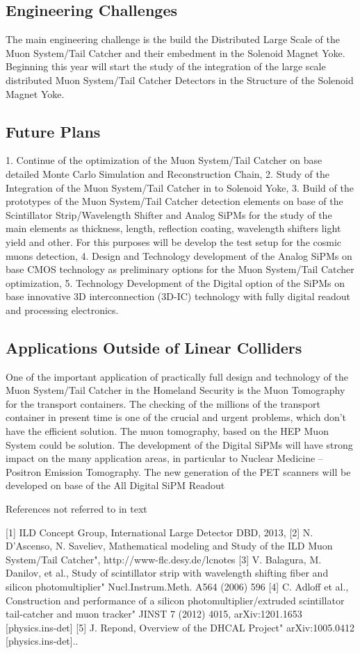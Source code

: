 \subsection{Engineering Challenges}
The main engineering challenge is the build the Distributed Large Scale of the Muon System/Tail Catcher and their embedment in the Solenoid Magnet Yoke. Beginning this year will start the study of the integration of the large scale distributed Muon System/Tail Catcher Detectors in the Structure of the Solenoid Magnet Yoke.

\subsection{Future Plans}
1.	Continue of the optimization of the Muon System/Tail Catcher on base detailed Monte Carlo Simulation and Reconstruction Chain,
2.	Study of the Integration of the Muon System/Tail Catcher in to Solenoid Yoke,
3.	Build of the prototypes of the Muon System/Tail Catcher detection elements on base of the Scintillator Strip/Wavelength Shifter and Analog SiPMs for the study of the main elements as thickness, length, reflection coating, wavelength shifters light yield and other. For this purposes will be develop the test setup for the cosmic muons detection,
4.	Design and Technology development of the Analog SiPMs on base CMOS technology as preliminary options for the Muon System/Tail Catcher optimization,
5.	Technology Development of the Digital option of the SiPMs on base innovative 3D interconnection (3D-IC) technology with fully digital readout and processing electronics.

\subsection{Applications Outside of Linear Colliders}
One of the important application of practically full design and technology of the Muon System/Tail Catcher in the Homeland Security is the Muon Tomography for the transport containers. The checking of the millions of the transport container in present time is one of the crucial and urgent problems, which don’t have the efficient solution. The muon tomography, based on the HEP Muon System could be solution. The development of the Digital SiPMs will have strong impact on the many application areas, in particular to Nuclear Medicine – Positron Emission Tomography.  The new generation of the PET scanners will be developed on base of the All Digital SiPM Readout


{\color{red} References not referred to in text}

[1]	ILD Concept Group, International Large Detector DBD, 2013,
[2]	N. D'Ascenso, N. Saveliev, Mathematical modeling and Study of the ILD Muon System/Tail Catcher", http://www-flc.desy.de/lcnotes
[3]	V. Balagura, M. Danilov, et al., Study of scintillator strip with wavelength shifting fiber and silicon photomultiplier" Nucl.Instrum.Meth. A564 (2006) 596
[4]	C. Adloff et al., Construction and performance of a silicon photomultiplier/extruded scintillator tail-catcher and muon tracker" JINST 7 (2012) 4015, arXiv:1201.1653 [physics.ins-det]
[5]	J. Repond, Overview of the DHCAL Project" arXiv:1005.0412 [physics.ins-det]..
